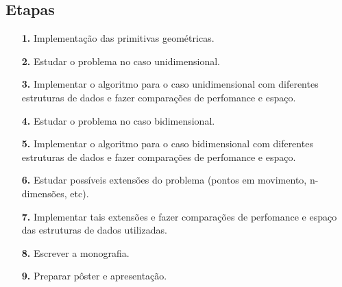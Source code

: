 \documentclass[10pt,twoside,a4paper]{article}
\begin{document}
\subsection{Etapas}
\begin{itemize}
\item[\textbf{1.}] Implementação das primitivas geométricas.
\item[\textbf{2.}] Estudar o problema no caso unidimensional.
\item[\textbf{3.}] Implementar o algoritmo para o caso unidimensional com diferentes estruturas de dados e fazer comparações de perfomance e espaço.
\item[\textbf{4.}] Estudar o problema no caso bidimensional.
\item[\textbf{5.}] Implementar o algoritmo para o caso bidimensional com diferentes estruturas de dados e fazer comparações de perfomance e espaço.
\item[\textbf{6.}] Estudar possíveis extensões do problema (pontos em movimento, n-dimensões, etc).
\item[\textbf{7.}] Implementar tais extensões e fazer comparações de perfomance e espaço das estruturas de dados utilizadas.
\item[\textbf{8.}] Escrever a monografia.
\item[\textbf{9.}] Preparar pôster e apresentação.
\end{itemize}
\end{document}
